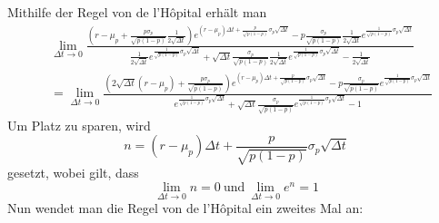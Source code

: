 \documentclass[11pt]{report} %
\begin{document}
Mithilfe der Regel von de l'Hôpital erhält man
\begin{align*}
    &\lim_{\Delta t \to 0}\frac{\left(r-\mu_p+\frac{p\sigma_p}{\sqrt{p(1-p)}}\frac{1}{2\sqrt{\Delta t}}\right)e^{(r-\mu_p)\Delta t+\frac{p}{\sqrt{p(1-p)}}\sigma_p\sqrt{\Delta t}}-p\frac{\sigma_p}{\sqrt{p(1-p)}}\frac{1}{2\sqrt{\Delta t}}e^{\frac{1}{\sqrt{p(1-p)}}\sigma_p\sqrt{\Delta t}}}{\frac{1}{2\sqrt{\Delta t}}e^{\frac{1}{\sqrt{p(1-p)}}\sigma_p\sqrt{\Delta t}}+\sqrt{\Delta t}\frac{\sigma_p}{\sqrt{p(1-p)}}\frac{1}{2\sqrt{\Delta t}}e^{\frac{1}{\sqrt{p(1-p)}}\sigma_p\sqrt{\Delta t}}-\frac{1}{2\sqrt{\Delta t}}}\\
    &=\lim_{\Delta t \to 0}\frac{\left(2\sqrt{\Delta t}(r-\mu_p)+\frac{p\sigma_p}{\sqrt{p(1-p)}}\right)e^{(r-\mu_p)\Delta t+\frac{p}{\sqrt{p(1-p)}}\sigma_p\sqrt{\Delta t}}-p\frac{\sigma_p}{\sqrt{p(1-p)}}e^{\frac{1}{\sqrt{p(1-p)}}\sigma_p\sqrt{\Delta t}}}{e^{\frac{1}{\sqrt{p(1-p)}}\sigma_p\sqrt{\Delta t}}+\sqrt{\Delta t}\frac{\sigma_p}{\sqrt{p(1-p)}}e^{\frac{1}{\sqrt{p(1-p)}}\sigma_p\sqrt{\Delta t}}-1}
\end{align*}
Um Platz zu sparen, wird $$n=(r-\mu_p)\Delta t+\frac{p}{\sqrt{p(1-p)}}\sigma_p\sqrt{\Delta t}$$ gesetzt, wobei gilt, dass $$\lim_{\Delta t \to 0}n = 0\ \text{und}\ \lim_{\Delta t \to 0}e^n = 1$$Nun wendet man die Regel von de l'Hôpital ein zweites Mal an:
\end{document}
